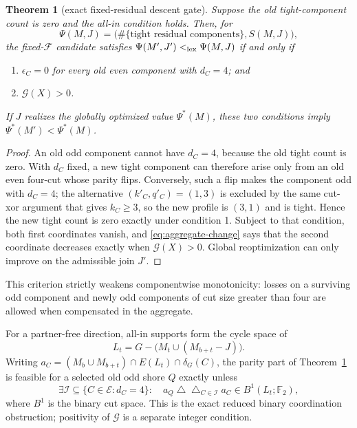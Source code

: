 \documentclass[11pt]{article}
\newtheorem{theorem}{Theorem}[section]
\theoremstyle{definition}
\theoremstyle{remark}
\newcommand{\F}{\mathbb F}
\numberwithin{equation}{section}
\begin{document}
\begin{theorem}[exact fixed-residual descent gate]
\label{thm:aggregate-gate}
Suppose the old tight-component count is zero and the all-in condition
holds.  Then, for
\[
 \Psi(M,J)=\bigl(\#\{\text{tight residual components}\},S(M,J)\bigr),
\]
the fixed-\(\mathcal F\) candidate satisfies
\(\Psi(M',J')<_{\rm lex}\Psi(M,J)\) if and only if
\begin{enumerate}
 \item \(\epsilon_C=0\) for every old even component with \(d_C=4\); and
 \item \(\mathcal G(X)>0\).
\end{enumerate}
If \(J\) realizes the globally optimized value \(\Psi^*(M)\), these two
conditions imply \(\Psi^*(M')<\Psi^*(M)\).
\end{theorem}

\begin{proof}
An old odd component cannot have \(d_C=4\), because the old tight count is
zero.  With \(d_C\) fixed, a new tight component can therefore arise only
from an old even four-cut whose parity flips.  Conversely, such a flip
makes the component odd with \(d_C=4\); the alternative
\((k'_C,q'_C)=(1,3)\) is excluded by the same cut-xor argument that gives
\(k_C\ge3\), so the new profile is \((3,1)\) and is tight.  Hence the new
tight count is zero exactly under condition 1.  Subject to that condition,
both first coordinates vanish, and \eqref{eq:aggregate-change} says that
the second coordinate decreases exactly when \(\mathcal G(X)>0\).
Global reoptimization can only improve on the admissible join \(J'\).
\end{proof}

This criterion strictly weakens componentwise monotonicity: losses on a
surviving odd component and newly odd components of cut size greater than
four are allowed when compensated in the aggregate.

For a partner-free direction, all-in supports form the cycle space of
\[
 L_t=G-\bigl(M_t\cup(M_{b+t}-J)\bigr).
\]
Writing
\(a_C=(M_b\cup M_{b+t})\cap E(L_t)\cap\delta_G(C)\), the parity part of
Theorem~\ref{thm:aggregate-gate} is feasible for a selected old odd shore
\(Q\) exactly unless
\begin{equation}
 \exists\mathcal I\subseteq\{C\in\mathcal E:d_C=4\}:\quad
 a_Q\mathbin{\triangle}\mathop{\triangle}_{C\in\mathcal I}a_C
 \in B^1(L_t;\F_2),                                         \label{eq:reduced-cut-obstruction}
\end{equation}
where \(B^1\) is the binary cut space.  This is the exact reduced binary
coordination obstruction; positivity of \(\mathcal G\) is a separate
integer condition.
\end{document}
